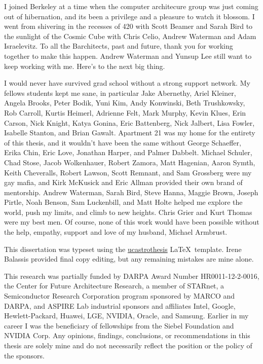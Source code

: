 \documentclass[12pt]{myucthesis}
\begin{document}
\begin{frontmatter}
\begin{acknowledgements}
I joined Berkeley at a time when the computer architecure group was just coming out of hibernation,
and its been a privilege and a pleasure to watch it blossom.
I went from shivering in the recesses of 420 with Scott Beamer and Sarah Bird
to the sunlight of the Cosmic Cube with Chris Celio, Andrew Waterman and Adam Israelevitz.
To all the Barchitects, past and future, thank you for working together to make this happen.
Andrew Waterman and Yunsup Lee still want to keep working with me.
Here's to the next big thing.

I would never have survived grad school without a strong support network.
My fellows students kept me sane, in particular
Jake Abernethy, Ariel Kleiner, Angela Brooks, Peter Bodik, Yuni Kim,
Andy Konwinski, Beth Trushkowsky, Rob Carroll, Kurtis Heimerl, Adrienne Felt, Mark Murphy,
Kevin Klues, Erin Carson, Nick Knight, Katya Gonina, Eric Battenberg, Nick Jalbert,
Lisa Fowler, Isabelle Stanton, and Brian Gawalt.
Apartment 21 was my home for the entirety of this thesis, and it wouldn't have been the same without
George Schaeffer, Erika Chin, Eric Love, Jonathan Harper, and Palmer Dabbelt.
Michael Schuler, Chad Stose, Jacob Wolkenhauer, Robert Zamora, Matt Hagenian,
Aaron Symth, Keith Cheveralls, Robert Lawson,
Scott Remnant, and Sam Grossberg were my gay mafia, and 
Kirk McKusick and Eric Allman provided their own brand of mentorship.
Andrew Waterman, Sarah Bird, Steve Hanna, Maggie Brown, Joseph Pirtle, Noah Benson, Sam Luckenbill, and Matt Holte
helped me explore the world, push my limits, and climb to new heights.
Chris Grier and Kurt Thomas were my best men.
Of course, none of this work would have been possible without the help, empathy,  support and love
 of my husband, Michael Armbrust.

This dissertation was typeset using the
\href{https://github.com/pkgw/ucastrothesis}{\textsf{ucastrothesis}}
\LaTeX\ template.
Irene Balassis provided final copy editing, but any remaining mistakes are mine alone.

This research was partially funded by DARPA Award Number HR0011-12-2-0016, the Center for Future Architecture Research, a member of STARnet, a Semiconductor Research Corporation program sponsored by MARCO and DARPA, and ASPIRE Lab industrial sponsors and affiliates Intel, Google, Hewlett-Packard, Huawei, LGE, NVIDIA, Oracle, and Samsung.
Earlier in my career I was the beneficiary of fellowships from the Siebel Foundation and NVIDIA Corp.
Any opinions, findings, conclusions, or recommendations in this thesis are solely mine and do not necessarily reflect the position or the policy of the sponsors.

\end{acknowledgements}
\end{frontmatter}






{}
\appendix


\end{document}
